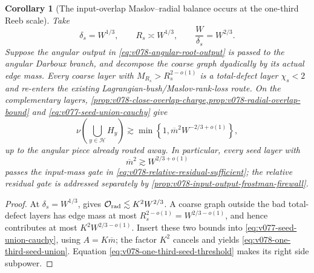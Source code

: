 \documentclass[10pt]{article}
\newtheorem{corollary}[theorem]{Corollary}
\begin{document}
\begin{corollary}[The input-overlap Maslov--radial balance occurs at the one-third Reeb scale]
\label{cor:v078-one-third-maslov-radial-balance}
Take
\begin{equation}
\label{eq:v078-one-third-choice}
\boxed{
\delta_s=W^{1/3},
\qquad
R_s\asymp W^{1/3},
\qquad
\frac W{\delta_s}=W^{2/3}.
}
\end{equation}
Suppose the angular output in
\eqref{eq:v078-angular-root-output} is passed to the angular Darboux branch, and decompose the
coarse graph dyadically by its actual edge mass.  Every coarse layer with
\(M_{R_s}>R_s^{2-o(1)}\) is a total-defect layer \(\chi_s<2\) and re-enters the existing
Lagrangian-bush/Maslov-rank-loss route.  On the complementary layers,
\cref{prop:v078-close-overlap-charge,prop:v078-radial-overlap-bound} and
\eqref{eq:v077-seed-union-cauchy} give
\begin{equation}
\label{eq:v078-one-third-seed-union}
\boxed{
\nu\!\left(\bigcup_{y\in\mathcal H}H_y\right)
\gtrsim
\min\left\{1,\overline m^2W^{-2/3+o(1)}\right\},
}
\end{equation}
up to the angular piece already routed away.  In particular, every seed layer with
\begin{equation}
\label{eq:v078-one-third-seed-threshold}
\boxed{
\overline m^2\gtrsim W^{2/3+o(1)}
}
\end{equation}
passes the input-mass gate in \eqref{eq:v078-relative-residual-sufficient}; the relative residual
gate is addressed separately by \cref{prop:v078-input-output-frostman-firewall}.
\end{corollary}

\begin{proof}
At \(\delta_s=W^{1/3}\),  gives
\(\mathcal O_{\rm rad}\lesssim K^2W^{2/3}\).  A coarse graph outside the bad total-defect layers
has edge mass at most \(R_s^{2-o(1)}=W^{2/3-o(1)}\), and hence contributes at most
\(K^2W^{2/3-o(1)}\).  Insert these two bounds into
\eqref{eq:v077-seed-union-cauchy}, using \(A=K\overline m\); the factor \(K^2\) cancels and yields
\eqref{eq:v078-one-third-seed-union}.  Equation
\eqref{eq:v078-one-third-seed-threshold} makes its right side subpower.
\end{proof}
\end{document}
